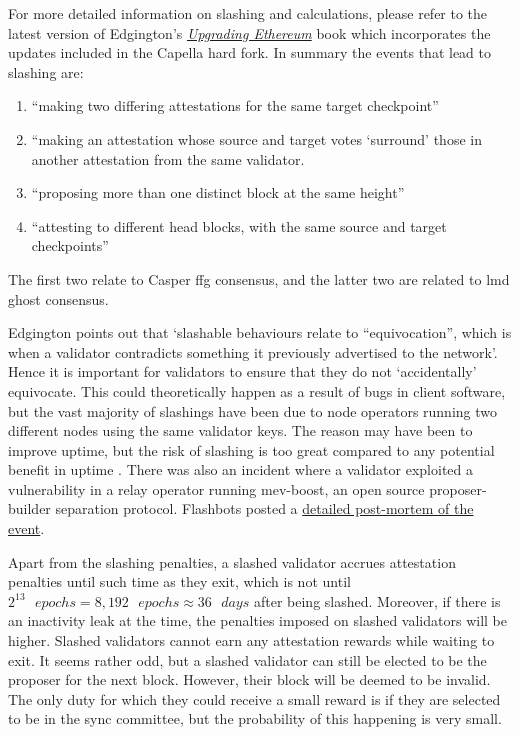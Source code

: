 \documentclass[UTF8]{article}
\begin{document}
For more detailed information on slashing and calculations, please refer to the latest version of Edgington's  \href{https://eth2book.info/capella/part2/incentives/slashing/}{\textit{Upgrading Ethereum}} book \cite{Edgington2023}  which incorporates the updates included in the Capella hard fork. In summary the events that lead to slashing are:

\begin{enumerate}
\item ``making two differing attestations for the same target checkpoint''
\item ``making an attestation whose source and target votes `surround' those in another attestation from the same validator.
\item ``proposing more than one distinct block at the same height''
\item ``attesting to different head blocks, with the same source and target checkpoints''
\end{enumerate}

The first two relate to Casper \gls{ffg} consensus, and the latter two are related to \gls{lmd} \gls{ghost} consensus.

Edgington points out that `slashable behaviours relate to ``equivocation'', which is when a validator contradicts something it previously advertised to the network'. Hence it is important for validators to ensure that they do not `accidentally' equivocate. This could theoretically happen as a result of bugs in client software, but the vast majority of slashings have been due to node operators running two different nodes using the same validator keys. The reason may have been to improve uptime, but the risk of slashing is too great compared to any potential benefit in uptime \cite{Edgington2023}. There was also an incident where a validator exploited a vulnerability in a relay operator running mev-boost, an open source proposer-builder separation protocol. Flashbots posted a \href{https://collective.flashbots.net/t/post-mortem-april-3rd-2023-mev-boost-relay-incident-and-related-timing-issue/1540}{detailed post-mortem of the event}.

Apart from the slashing penalties, a slashed validator accrues attestation penalties until such time as they exit, which is not until $2^{13} \texttt{ }epochs = 8,192 \texttt{ }epochs \approx 36 \texttt{ } days$ after being slashed. Moreover,  if there is an inactivity leak at the time, the penalties imposed on slashed validators will be higher. Slashed validators cannot earn any attestation rewards while waiting to exit. It seems rather odd, but a slashed validator can still be elected to be the proposer for the next block. However, their block will be deemed to be invalid. The only duty for which they could receive a small reward is if they are selected to be in the sync committee, but the probability of this happening is very small. 
\end{document}
